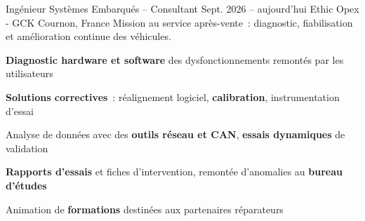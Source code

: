 \documentclass[10pt]{article}
\begin{document}
\begin{cvmain}



\begin{cvtimeline}

\cvexperience
  {Ingénieur Systèmes Embarqués -- Consultant}
  {Sept. 2026 -- aujourd’hui}
  {Ethic Opex - GCK}
  {Cournon, France}
  {Mission au service après-vente~: diagnostic, fiabilisation et amélioration continue des véhicules.}
\begin{cvitems}
  \item \textbf{Diagnostic hardware et software} des dysfonctionnements remontés par les utilisateurs
  \item \textbf{Solutions correctives}~: réalignement logiciel, \textbf{calibration}, instrumentation d’essai
  \item Analyse de données avec des \textbf{outils réseau et CAN}, \textbf{essais dynamiques} de validation
  \item \textbf{Rapports d’essais} et fiches d’intervention, remontée d’anomalies au \textbf{bureau d’études}
  \item Animation de \textbf{formations} destinées aux partenaires réparateurs
\end{cvitems}


\end{cvtimeline}
\end{cvmain}
\end{document}
